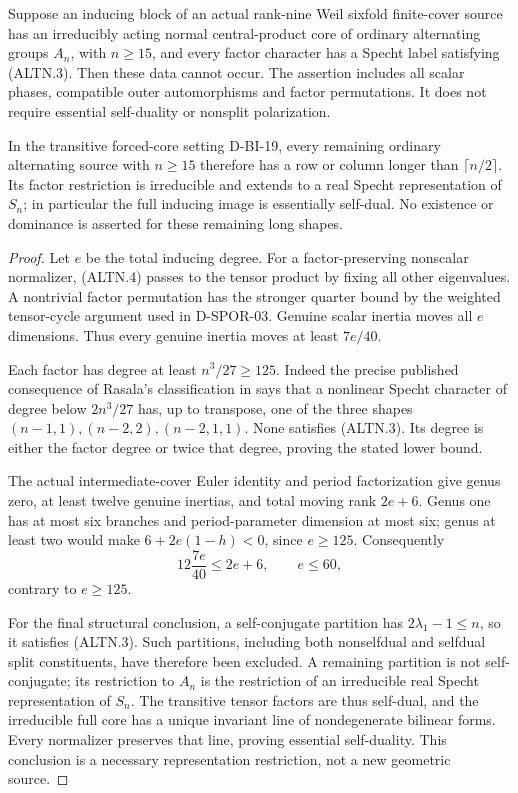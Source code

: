 \begin{theorem}
\label{HD-ALT-03c}
Suppose an inducing block of an actual rank-nine Weil sixfold
finite-cover source has an irreducibly acting normal central-product
core of ordinary alternating groups $A_n$, with $n\ge15$,
and every factor character has a Specht label satisfying (ALTN.3).
Then these data cannot occur. The assertion includes all scalar
phases, compatible outer automorphisms and factor permutations.
It does not require essential self-duality or nonsplit polarization.

In the transitive forced-core setting D-BI-19, every remaining
ordinary alternating source with $n\ge15$ therefore has a row or
column longer than $\lceil n/2\rceil$. Its factor restriction
is irreducible and extends to a real Specht representation of $S_n$;
in particular the full inducing image is essentially self-dual.
No existence or dominance is asserted for these remaining long shapes.
\end{theorem}

\begin{proof}
Let $e$ be the total inducing degree. For a factor-preserving
nonscalar normalizer, (ALTN.4) passes to the tensor product by
fixing all other eigenvalues. A nontrivial factor permutation
has the stronger quarter bound by the weighted tensor-cycle
argument used in D-SPOR-03. Genuine scalar inertia moves all
$e$ dimensions. Thus every genuine inertia moves at least $7e/40$.

Each factor has degree at least $n^3/27\ge125$. Indeed the precise
published consequence of Rasala's classification in
\cite[proof of Theorem~9.7, p.~312]{HD:GKT2019} says that a
nonlinear Specht character of degree below $2n^3/27$ has, up to
transpose, one of the three shapes $(n-1,1),(n-2,2),(n-2,1,1)$.
None satisfies (ALTN.3). Its degree is either the factor degree
or twice that degree, proving the stated lower bound.

The actual intermediate-cover Euler identity and period
factorization give genus zero, at least twelve genuine inertias,
and total moving rank $2e+6$. Genus one has at most six branches
and period-parameter dimension at most six; genus at least two
would make $6+2e(1-h)<0$, since $e\ge125$. Consequently
\[
            12\frac{7e}{40}\le2e+6,
                         \qquad e\le60,                  \tag{ALTN.9}
\]
contrary to $e\ge125$.

For the final structural conclusion, a self-conjugate partition
has $2\lambda_1-1\le n$, so it satisfies (ALTN.3). Such partitions,
including both nonselfdual and selfdual split constituents, have
therefore been excluded. A remaining partition is not self-conjugate;
its restriction to $A_n$ is the restriction of an irreducible
real Specht representation of $S_n$. The transitive tensor factors
are thus self-dual, and the irreducible full core has a unique
invariant line of nondegenerate bilinear forms. Every normalizer
preserves that line, proving essential self-duality. This conclusion
is a necessary representation restriction, not a new geometric source.
\end{proof}

